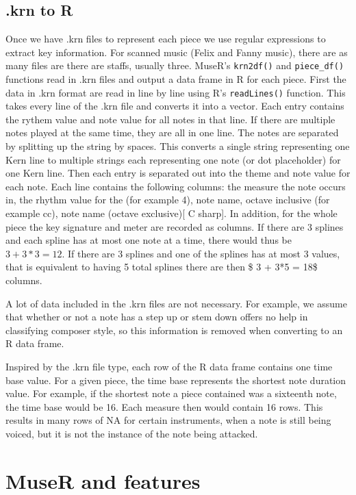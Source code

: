\documentclass[12pt,twoside]{reedthesis}
\theoremstyle{definition}
\theoremstyle{definition}
\theoremstyle{definition}
\theoremstyle{remark}
\begin{document}
\section{.krn to R}\label{krn-to-r}

Once we have .krn files to represent each piece we use regular
expressions to extract key information. For scanned music (Felix and
Fanny music), there are as many files are there are staffs, usually
three. MuseR's \texttt{krn2df()} and \texttt{piece\_df()} functions read
in .krn files and output a data frame in R for each piece. First the
data in .krn format are read in line by line using R's
\texttt{readLines()} function. This takes every line of the .krn file
and converts it into a vector. Each entry contains the rythem value and
note value for all notes in that line. If there are multiple notes
played at the same time, they are all in one line. The notes are
separated by splitting up the string by spaces. This converts a single
string representing one Kern line to multiple strings each representing
one note (or dot placeholder) for one Kern line. Then each entry is
separated out into the theme and note value for each note. Each line
contains the following columns: the measure the note occurs in, the
rhythm value for the (for example 4), note name, octave inclusive (for
example cc), note name (octave exclusive){[} C sharp{]}. In addition,
for the whole piece the key signature and meter are recorded as columns.
If there are 3 splines and each spline has at most one note at a time,
there would thus be \(3 + 3*3=12\). If there are 3 splines and one of
the splines has at most 3 values, that is equivalent to having 5 total
splines there are then \$ 3 + 3*5 = 18\$ columns.

A lot of data included in the .krn files are not necessary. For example,
we assume that whether or not a note has a step up or stem down offers
no help in classifying composer style, so this information is removed
when converting to an R data frame.

Inspired by the .krn file type, each row of the R data frame contains
one time base value. For a given piece, the time base represents the
shortest note duration value. For example, if the shortest note a piece
contained was a sixteenth note, the time base would be 16. Each measure
then would contain 16 rows. This results in many rows of NA for certain
instruments, when a note is still being voiced, but it is not the
instance of the note being attacked.

\chapter{MuseR and features}\label{muser-and-features}
\end{document}
